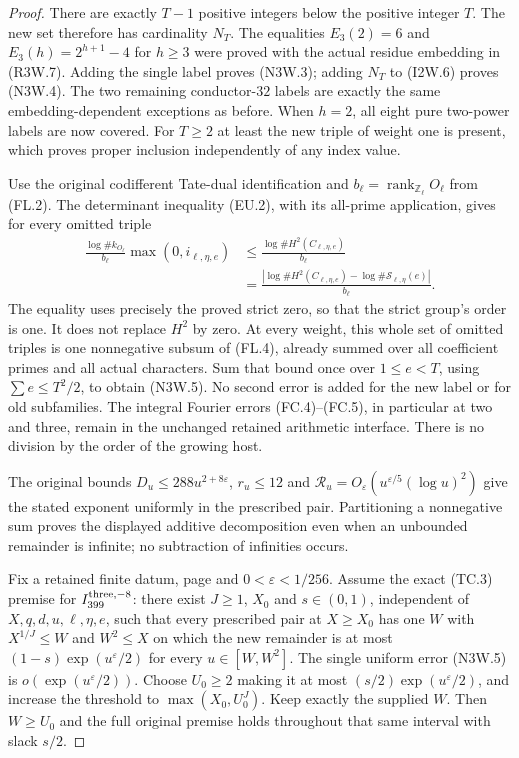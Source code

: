 \begin{proof}
There are exactly $T-1$ positive integers below the positive
integer $T$. The new set therefore has cardinality $N_T$.
The equalities $E_3(2)=6$ and $E_3(h)=2^{h+1}-4$ for $h\geq3$
were proved with the actual residue embedding in (R3W.7).
Adding the single label proves (N3W.3); adding $N_T$ to (I2W.6)
proves (N3W.4). The two remaining conductor-$32$ labels are exactly
the same embedding-dependent exceptions as before.
When $h=2$, all eight pure two-power labels are now covered.
For $T\geq2$ at least the new triple of weight one is present,
which proves proper inclusion independently of any index value.

Use the original codifferent Tate-dual identification and
$b_\ell=\operatorname{rank}_{\mathbb Z_\ell}O_\ell$ from (FL.2).
The determinant inequality (EU.2), with its all-prime application,
gives for every omitted triple
\[
 \begin{aligned}
 \frac{\log\#k_{O_\ell}}{b_\ell}\max(0,i_{\ell,\eta,e})
 &\leq\frac{\log\#H^2(C_{\ell,\eta,e})}{b_\ell}\\
 &=\frac{\left|\log\#H^2(C_{\ell,\eta,e})
                 -\log\#\mathcal S_{\ell,\eta}(e)\right|}{b_\ell}.
 \end{aligned}
 \tag{N3W.7}
\]
The equality uses precisely the proved strict zero, so that the
strict group's order is one. It does not replace $H^2$ by zero.
At every weight, this whole set of omitted triples is one
nonnegative subsum of (FL.4), already summed over all coefficient
primes and all actual characters. Sum that bound once over
$1\leq e<T$, using $\sum e\leq T^2/2$, to obtain (N3W.5).
No second error is added for the new label or for old subfamilies.
The integral Fourier errors (FC.4)--(FC.5), in particular at
two and three, remain in the unchanged retained arithmetic interface.
There is no division by the order of the growing host.

The original bounds $D_u\leq288u^{2+8\varepsilon}$,
$r_u\leq12$ and
$\mathcal R_u=O_\varepsilon(u^{\varepsilon/5}(\log u)^2)$
give the stated exponent uniformly in the prescribed pair.
Partitioning a nonnegative sum proves the displayed additive
decomposition even when an unbounded remainder is infinite;
no subtraction of infinities occurs.

Fix a retained finite datum, page and $0<\varepsilon<1/256$.
Assume the exact (TC.3) premise for $I_{399}^{\rm three,-8}$:
there exist $J\geq1$, $X_0$ and $s\in(0,1)$, independent of
$X,q,d,u,\ell,\eta,e$, such that every prescribed pair at
$X\geq X_0$ has one $W$ with $X^{1/J}\leq W$ and $W^2\leq X$
on which the new remainder is at most
$(1-s)\exp(u^\varepsilon/2)$ for every $u\in[W,W^2]$.
The single uniform error (N3W.5) is
$o(\exp(u^\varepsilon/2))$. Choose $U_0\geq2$ making it at
most $(s/2)\exp(u^\varepsilon/2)$, and increase the threshold to
$\max(X_0,U_0^J)$. Keep exactly the supplied $W$.
Then $W\geq U_0$ and the full original premise holds throughout
that same interval with slack $s/2$.


\end{proof}
